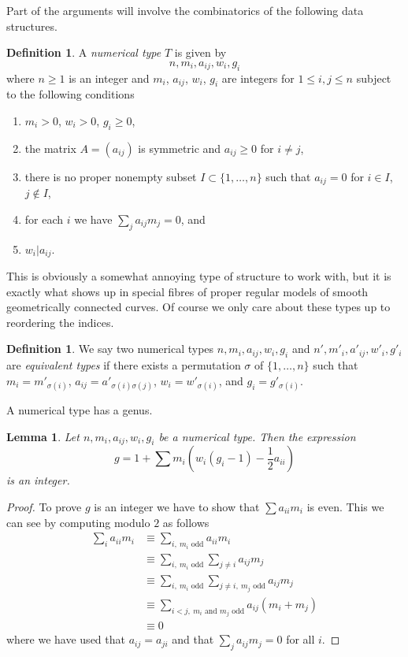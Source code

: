 \documentclass[10pt,a4paper]{amsart}
\theoremstyle{plain}
\newtheorem{lemma}[subsection]{Lemma}
\theoremstyle{definition}
\newtheorem{definition}[subsection]{Definition}
\theoremstyle{remark}
\numberwithin{equation}{subsection}
\begin{document}
\noindent
Part of the arguments will involve the combinatorics of the following
data structures.

\begin{definition}
\label{definition-type}
A {\it numerical type} $T$ is given by
$$
n, m_i, a_{ij}, w_i, g_i
$$
where $n \geq 1$ is an integer and $m_i$, $a_{ij}$, $w_i$, $g_i$
are integers for $1 \leq i, j \leq n$ subject to the following conditions
\begin{enumerate}
\item $m_i > 0$, $w_i > 0$, $g_i \geq 0$,
\item the matrix $A = (a_{ij})$ is symmetric and $a_{ij} \geq 0$
for $i \not = j$,
\item there is no proper nonempty subset $I \subset \{1, \ldots, n\}$
such that $a_{ij} = 0$ for $i \in I$, $j \not \in I$,
\item for each $i$ we have $\sum_j a_{ij}m_j = 0$, and
\item $w_i | a_{ij}$.
\end{enumerate}
\end{definition}

\noindent
This is obviously a somewhat annoying type of structure to work with,
but it is exactly what shows up in special fibres of proper regular
models of smooth geometrically connected curves.
Of course we only care about these types up to reordering the indices.

\begin{definition}
\label{definition-type-equivalent}
We say two numerical types $n, m_i, a_{ij}, w_i, g_i$ and
$n', m'_i, a'_{ij}, w'_i, g'_i$ are {\it equivalent types} if
there exists a permutation $\sigma$ of $\{1, \ldots, n\}$
such that $m_i = m'_{\sigma(i)}$, $a_{ij} = a'_{\sigma(i)\sigma(j)}$,
$w_i = w'_{\sigma(i)}$, and $g_i = g'_{\sigma(i)}$.
\end{definition}

\noindent
A numerical type has a genus.

\begin{lemma}
\label{lemma-genus}
Let $n, m_i, a_{ij}, w_i, g_i$ be a numerical type. Then the expression
$$
g = 1 + \sum m_i(w_i(g_i - 1) - \frac{1}{2} a_{ii})
$$
is an integer.
\end{lemma}

\begin{proof}
To prove $g$ is an integer we have to show that $\sum a_{ii}m_i$ is even.
This we can see by computing modulo $2$ as follows
\begin{align*}
\sum\nolimits_i a_{ii} m_i 
& \equiv
\sum\nolimits_{i,\ m_i\text{ odd}} a_{ii}m_i \\
& \equiv
\sum\nolimits_{i,\ m_i\text{ odd}} \sum\nolimits_{j \not = i} a_{ij}m_j \\
& \equiv
\sum\nolimits_{i,\ m_i\text{ odd}}
\sum\nolimits_{j \not = i,\ m_j\text{ odd}} a_{ij}m_j \\
& \equiv
\sum\nolimits_{i < j,\ m_i\text{ and }m_j\text{ odd}} a_{ij}(m_i + m_j) \\
& \equiv
0
\end{align*}
where we have used that $a_{ij} = a_{ji}$ and that $\sum_j a_{ij}m_j = 0$
for all $i$.
\end{proof}
\end{document}

